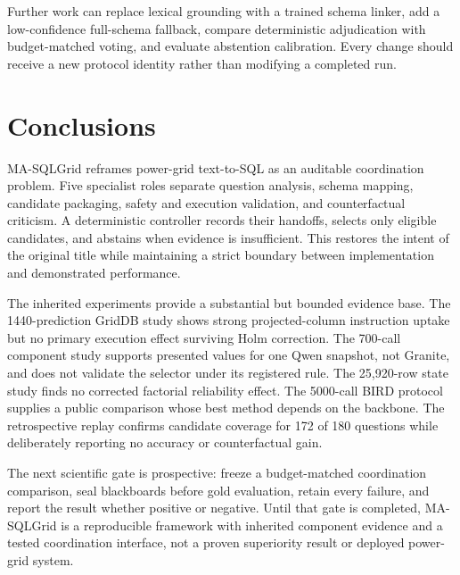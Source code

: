 \documentclass[applsci,article,submit,moreauthors]{Definitions/mdpi}
\newcommand{\masql}{MA-SQLGrid}
\begin{document}
Further work can replace lexical grounding with a trained schema linker, add a low-confidence full-schema fallback, compare deterministic adjudication with budget-matched voting, and evaluate abstention calibration. Every change should receive a new protocol identity rather than modifying a completed run.

\section{Conclusions}

\masql{} reframes power-grid text-to-SQL as an auditable coordination problem. Five specialist roles separate question analysis, schema mapping, candidate packaging, safety and execution validation, and counterfactual criticism. A deterministic controller records their handoffs, selects only eligible candidates, and abstains when evidence is insufficient. This restores the intent of the original title while maintaining a strict boundary between implementation and demonstrated performance.

The inherited experiments provide a substantial but bounded evidence base. The 1440-prediction GridDB study shows strong projected-column instruction uptake but no primary execution effect surviving Holm correction. The 700-call component study supports presented values for one Qwen snapshot, not Granite, and does not validate the selector under its registered rule. The 25,920-row state study finds no corrected factorial reliability effect. The 5000-call BIRD protocol supplies a public comparison whose best method depends on the backbone. The retrospective replay confirms candidate coverage for 172 of 180 questions while deliberately reporting no accuracy or counterfactual gain.

The next scientific gate is prospective: freeze a budget-matched coordination comparison, seal blackboards before gold evaluation, retain every failure, and report the result whether positive or negative. Until that gate is completed, \masql{} is a reproducible framework with inherited component evidence and a tested coordination interface, not a proven superiority result or deployed power-grid system.
\end{document}
